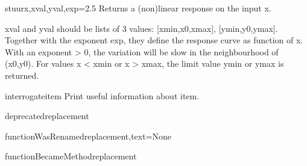 \begin{funcdesc}{stuur}{x,xval,yval,exp=2.5}
Returns a (non)linear response on the input x.

    xval and yval should be lists of 3 values:
      [xmin,x0,xmax], [ymin,y0,ymax].
    Together with the exponent exp, they define the response curve
    as function of x. With an exponent > 0, the variation will be
    slow in the neighbourhood of (x0,y0).
    For values x < xmin or x > xmax, the limit value ymin or ymax
    is returned.
    
\end{funcdesc}

\begin{funcdesc}{interrogate}{item}
Print useful information about item.
\end{funcdesc}

\begin{funcdesc}{deprecated}{replacement}

\end{funcdesc}

\begin{funcdesc}{functionWasRenamed}{replacement,text=None}

\end{funcdesc}

\begin{funcdesc}{functionBecameMethod}{replacement}

\end{funcdesc}


